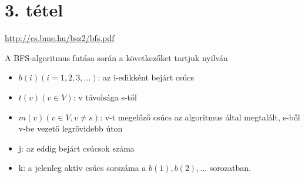 \section{3. tétel}

\url{http://cs.bme.hu/bsz2/bfs.pdf}

\begin{tetel}{A BFS-algoritmus futása során a következőket tartjuk nyilván}
\begin{itemize}
\item $b(i) (i = 1,2,3,...)$: az i-edikként bejárt csúcs
\item $t(v) (v \in V)$: v távolsága s-től
\item $m(v) (v \in V, v \neq s)$: v-t megelőző csúcs az algoritmus által megtalált, s-ből v-be vezető legrövidebb úton
\item j: az eddig bejárt csúcsok száma
\item k: a jelenleg aktív csúcs sorszáma a $b(1), b(2),...$ sorozatban.
\end{itemize}
\end{tetel}

